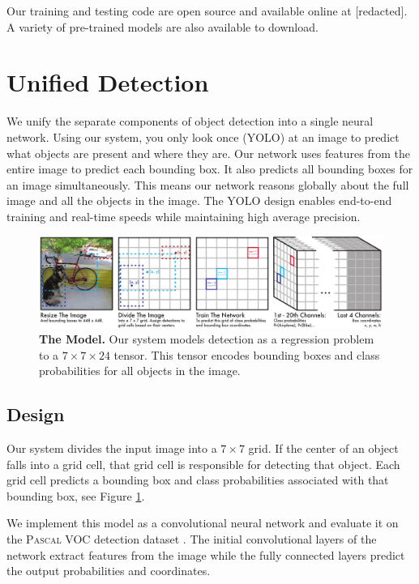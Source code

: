 \documentclass{article} %
\begin{document}
Our training and testing code are open source and available online at [redacted]. A variety of pre-trained models are also available to download.

\section{Unified Detection}

We unify the separate components of object detection into a single neural network. Using our system, you only look once (YOLO) at an image to predict what objects are present and where they are. Our network uses features from the entire image to predict each bounding box. It also predicts all bounding boxes for an image simultaneously. This means our network reasons globally about the full image and all the objects in the image. The YOLO design enables end-to-end training and real-time speeds while maintaining high average precision.

\begin{figure}[h]
\begin{center}
        \includegraphics[width=\linewidth]{full}
\end{center}
   \caption{\textbf{The Model.} Our system models detection as a regression problem to a $7 \times 7 \times 24$ tensor. This tensor encodes bounding boxes and class probabilities for all objects in the image.}
\label{model}
\end{figure}

\subsection{Design}

Our system divides the input image into a $7 \times 7$ grid. If the center of an object falls into a grid cell, that grid cell is responsible for detecting that object. Each grid cell predicts a bounding box and class probabilities associated with that bounding box, see Figure \ref{model}.

We implement this model as a convolutional neural network and evaluate it on the \textsc{Pascal} VOC detection dataset \cite{Everingham15}. The initial convolutional layers of the network extract features from the image while the fully connected layers predict the output probabilities and coordinates.
\end{document}

